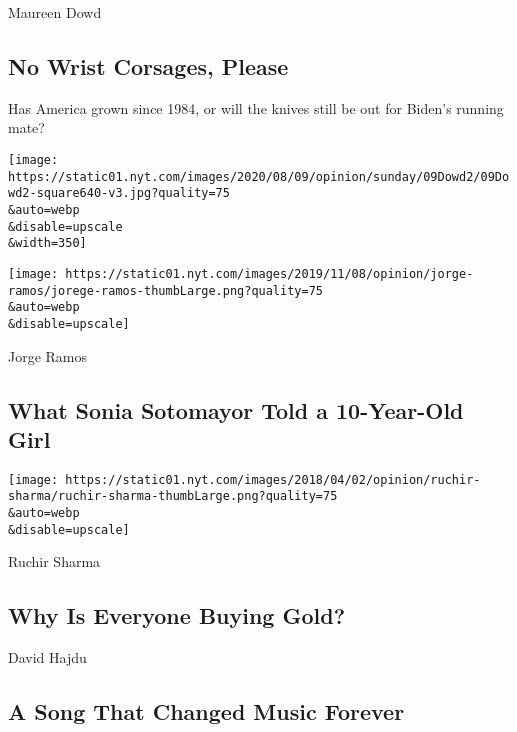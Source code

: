 Maureen Dowd

\hypertarget{no-wrist-corsages-please}{%
\subsection{No Wrist Corsages, Please}\label{no-wrist-corsages-please}}

Has America grown since 1984, or will the knives still be out for
Biden's running mate?

\href{/2020/08/08/opinion/sunday/biden-vice-president-geraldine-ferraro.html}{}

\texttt{[image: https://static01.nyt.com/images/2020/08/09/opinion/sunday/09Dowd2/09Dowd2-square640-v3.jpg?quality=75\\\&auto=webp\\\&disable=upscale\\\&width=350]}

\href{/2020/08/07/opinion/latina-women-politics.html}{}

\texttt{[image: https://static01.nyt.com/images/2019/11/08/opinion/jorge-ramos/jorege-ramos-thumbLarge.png?quality=75\\\&auto=webp\\\&disable=upscale]}

Jorge Ramos

\hypertarget{what-sonia-sotomayor-told-a-10-year-old-girl}{%
\subsection{What Sonia Sotomayor Told a 10-Year-Old
Girl}\label{what-sonia-sotomayor-told-a-10-year-old-girl}}

\href{/2020/08/08/opinion/gold-investment-coronavirus.html}{}

\texttt{[image: https://static01.nyt.com/images/2018/04/02/opinion/ruchir-sharma/ruchir-sharma-thumbLarge.png?quality=75\\\&auto=webp\\\&disable=upscale]}

Ruchir Sharma

\hypertarget{why-is-everyone-buying-gold}{%
\subsection{Why Is Everyone Buying
Gold?}\label{why-is-everyone-buying-gold}}

\href{/2020/08/08/opinion/sunday/crazy-blues-mamie-smith.html}{}

David Hajdu

\hypertarget{a-song-that-changed-music-forever}{%
\subsection{A Song That Changed Music
Forever}\label{a-song-that-changed-music-forever}}

